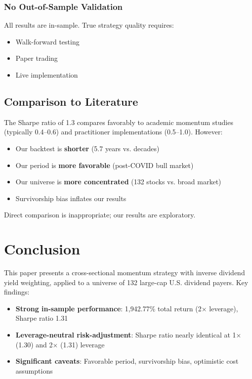 \documentclass[12pt,a4paper]{article}
\theoremstyle{definition}
\begin{document}
\subsubsection{No Out-of-Sample Validation}

All results are in-sample. True strategy quality requires:
\begin{itemize}
    \item Walk-forward testing
    \item Paper trading
    \item Live implementation
\end{itemize}

\subsection{Comparison to Literature}

The Sharpe ratio of 1.3 compares favorably to academic momentum studies (typically 0.4--0.6) and practitioner implementations (0.5--1.0). However:

\begin{itemize}
    \item Our backtest is \textbf{shorter} (5.7 years vs. decades)
    \item Our period is \textbf{more favorable} (post-COVID bull market)
    \item Our universe is \textbf{more concentrated} (132 stocks vs. broad market)
    \item Survivorship bias inflates our results
\end{itemize}

Direct comparison is inappropriate; our results are exploratory.

\section{Conclusion}
\label{sec:conclusion}

This paper presents a cross-sectional momentum strategy with inverse dividend yield weighting, applied to a universe of 132 large-cap U.S. dividend payers. Key findings:

\begin{itemize}
    \item \textbf{Strong in-sample performance}: 1,942.77\% total return (2$\times$ leverage), Sharpe ratio 1.31
    \item \textbf{Leverage-neutral risk-adjustment}: Sharpe ratio nearly identical at 1$\times$ (1.30) and 2$\times$ (1.31) leverage
    \item \textbf{Significant caveats}: Favorable period, survivorship bias, optimistic cost assumptions
\end{itemize}
\end{document}
